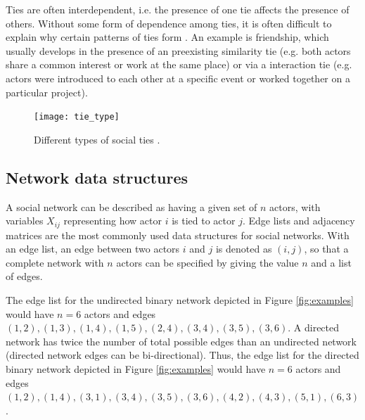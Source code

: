 Ties are often interdependent, i.e. the presence of one tie affects the presence of others. Without some form of dependence among ties, it is often difficult to explain why certain patterns of ties form \citep{lusher2013exponential}. An example is friendship, which usually develops in the presence of an preexisting similarity tie (e.g. both actors share a common interest or work at the same place) or via a interaction tie (e.g. actors were introduced to each other at a specific event or worked together on a particular project). \medskip

\begin{figure}
	\centering
	\texttt{[image: tie\_type]}
	\caption{Different types of social ties \citep{borgatti2013analyzing}.}
	\label{fig:tie_type}
\end{figure}

\subsection{Network data structures}

A social network can be described as having a given set of $n$ actors, with variables $X_{ij}$ representing how actor $i$ is tied to actor $j$. Edge lists and adjacency matrices are the most commonly used data structures for social networks. With an edge list, an edge between two actors $i$ and $j$ is denoted as $(i,j)$, so that a complete network with $n$ actors can be specified by giving the value $n$ and a list of edges. \medskip

The edge list for the undirected binary network depicted in Figure \ref{fig:examples} would have $n = 6$ actors and edges $(1,2),(1,3),(1,4),(1,5),(2,4),(3,4),(3,5),(3,6)$. A directed network has twice the number of total possible edges than an undirected network (directed network edges can be bi\hyp{}directional). Thus, the edge list for the directed binary network depicted in Figure \ref{fig:examples} would have $n = 6$ actors and edges $(1,2),(1,4),(3,1),(3,4),(3,5),(3,6),(4,2),(4,3),(5,1),(6,3)$. \medskip

